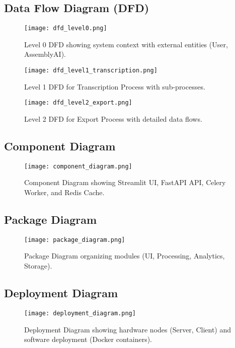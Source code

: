 \documentclass[12pt]{article}
\begin{document}
\subsection{Data Flow Diagram (DFD)}
\begin{figure}[H]
    \centering
    \texttt{[image: dfd\_level0.png]}
    \caption{Level 0 DFD showing system context with external entities (User, AssemblyAI).}
\end{figure}
\begin{figure}[H]
    \centering
    \texttt{[image: dfd\_level1\_transcription.png]}
    \caption{Level 1 DFD for Transcription Process with sub-processes.}
\end{figure}
\begin{figure}[H]
    \centering
    \texttt{[image: dfd\_level2\_export.png]}
    \caption{Level 2 DFD for Export Process with detailed data flows.}
\end{figure}

\subsection{Component Diagram}
\begin{figure}[H]
    \centering
    \texttt{[image: component\_diagram.png]}
    \caption{Component Diagram showing Streamlit UI, FastAPI API, Celery Worker, and Redis Cache.}
\end{figure}

\subsection{Package Diagram}
\begin{figure}[H]
    \centering
    \texttt{[image: package\_diagram.png]}
    \caption{Package Diagram organizing modules (UI, Processing, Analytics, Storage).}
\end{figure}

\subsection{Deployment Diagram}
\begin{figure}[H]
    \centering
    \texttt{[image: deployment\_diagram.png]}
    \caption{Deployment Diagram showing hardware nodes (Server, Client) and software deployment (Docker containers).}
\end{figure}
\end{document}

